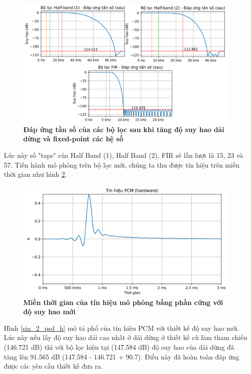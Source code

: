 \begin{figure}[H]
    \centering
    \includegraphics[width=14cm]{Images/Chuong4/tb/sim/filter_inc.png}
    \caption[Đáp ứng tần số của các bộ lọc sau  khi tăng độ suy hao dải dừng và fixed-point các hệ số]{\bfseries \fontsize{12pt}{0pt}\selectfont Đáp ứng tần số của các bộ lọc sau  khi tăng độ suy hao dải dừng và fixed-point các hệ số}
    \label{filter_inc}
\end{figure}
Lúc này số "taps" của Half Band (1), Half Band (2), FIR sẽ lần lượt là 15, 23 và 57.            
Tiến hành mô phỏng trên bộ lọc mới, chúng ta thu được tín hiệu trên miền thời gian như hình \ref{sin_2_h}.

\begin{figure}[H]
    \centering
    \includegraphics[width=12cm]{Images/Chuong4/tb/sim/sin_2_h.png}
    \caption[Miền thời gian của tín hiệu mô phỏng bằng phần cứng với độ suy hao mới]{\bfseries \fontsize{12pt}{0pt}\selectfont Miền thời gian của tín hiệu mô phỏng bằng phần cứng với độ suy hao mới}
    \label{sin_2_h}
\end{figure}

Hình \ref{sin_2_psd_h} mô tả phổ của tín hiệu PCM với thiết kế độ suy hao mới. Lúc này nếu lấy độ suy hao dải cao nhất ở dải dừng ở thiết kế cũ làm tham chiếu (146.721 dB) thì với bộ lọc hiện tại (147.584 dB) độ suy hao của dải dừng đã tăng lên 91.565 dB (147.584 - 146.721 + 90.7). Điều này đã hoàn toàn đáp ứng được các yêu cầu thiết kế đưa ra.

